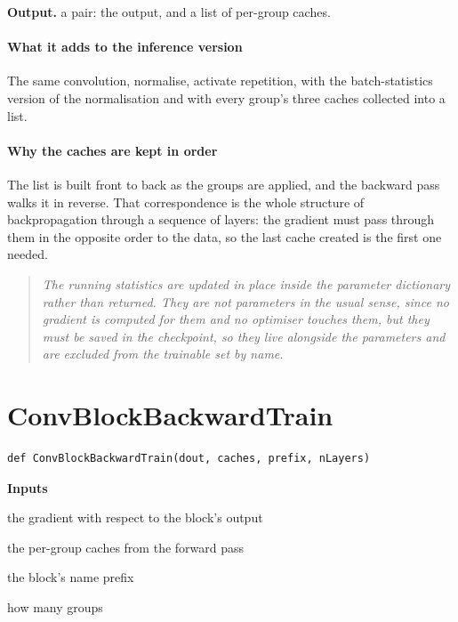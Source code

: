 \noindent\textbf{Output.} a pair: the output, and a list of per-group caches.


\paragraph{What it adds to the inference version}
The same convolution, normalise, activate repetition, with the batch-statistics version of the normalisation and with every group's three caches collected into a list.


\paragraph{Why the caches are kept in order}
The list is built front to back as the groups are applied, and the backward pass walks it in reverse. That correspondence is the whole structure of backpropagation through a sequence of layers: the gradient must pass through them in the opposite order to the data, so the last cache created is the first one needed.


\begin{quote}\small\itshape The running statistics are updated in place inside the parameter dictionary rather than returned. They are not parameters in the usual sense, since no gradient is computed for them and no optimiser touches them, but they must be saved in the checkpoint, so they live alongside the parameters and are excluded from the trainable set by name.\end{quote}

\section{ConvBlockBackwardTrain}
\begin{lstlisting}[style=sig]
def ConvBlockBackwardTrain(dout, caches, prefix, nLayers)
\end{lstlisting}

\noindent\textbf{Inputs}
\begin{description}[leftmargin=2.2em,style=nextline,font=\normalfont\ttfamily]\setlength\itemsep{1pt}
  \item[{dout}] \normalfont the gradient with respect to the block's output
  \item[{caches}] \normalfont the per-group caches from the forward pass
  \item[{prefix}] \normalfont the block's name prefix
  \item[{nLayers}] \normalfont how many groups
\end{description}

